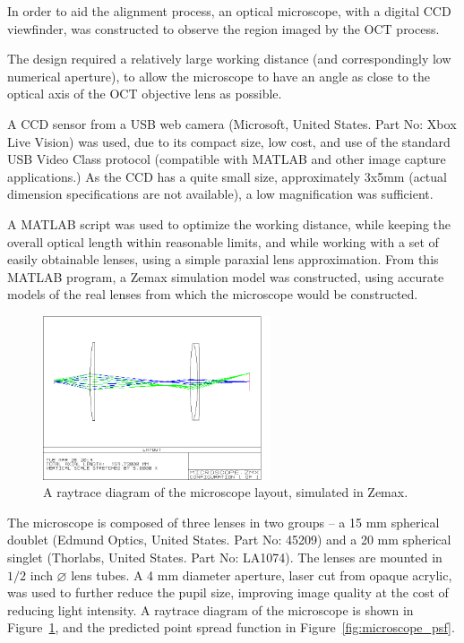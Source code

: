 In order to aid the alignment process, an optical microscope, with a digital CCD viewfinder, was constructed to observe the region imaged by the OCT process.

The design required a relatively large working distance (and correspondingly low numerical aperture), to allow the microscope to have an angle as close to the optical axis of the OCT objective lens as possible.

A CCD sensor from a USB web camera (Microsoft, United States. Part No: Xbox Live Vision) was used, due to its compact size, low cost, and use of the standard USB Video Class protocol (compatible with MATLAB and other image capture applications.) As the CCD has a quite small size, approximately 3x5mm (actual dimension specifications are not available), a low magnification was sufficient.

A MATLAB script was used to optimize the working distance, while keeping the overall optical length within reasonable limits, and while working with a set of easily obtainable lenses, using a simple paraxial lens approximation. From this MATLAB program, a Zemax simulation model was constructed, using accurate models of the real lenses from which the microscope would be constructed.

\begin{figure}[h!]
\centering
\includegraphics[width=0.6\textwidth]{Images/Zemax/microscope_layout_2.png}
\caption{A raytrace diagram of the microscope layout, simulated in Zemax.\label{fig:microscope_raytrace}}
\end{figure}

The microscope is composed of three lenses in two groups -- a 15 mm spherical doublet (Edmund Optics, United States. Part No: 45209) and a 20 mm spherical singlet (Thorlabs, United States. Part No: LA1074). The lenses are mounted in $1/2$ inch $\diameter$ lens tubes. A 4 mm diameter aperture, laser cut from opaque acrylic, was used to further reduce the pupil size, improving image quality at the cost of reducing light intensity. A raytrace diagram of the microscope is shown in Figure~\ref{fig:microscope_raytrace}, and the predicted point spread function in Figure~\ref{fig:microscope_psf}.

